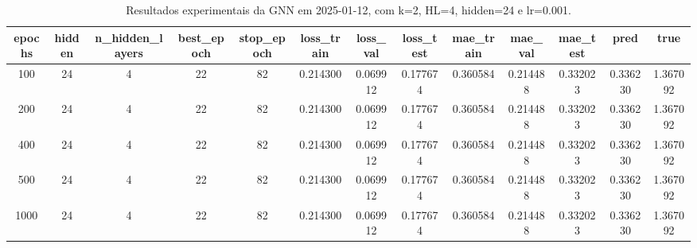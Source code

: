 \begin{table}[h]
\centering
\caption{Resultados experimentais da GNN em 2025-01-12, com k=2, HL=4, hidden=24 e lr=0.001.}
\label{tab:gnn_results_k2_hl4_h24_d20250112}
\begin{tabular}{ccccccccccccc}
\toprule
epochs & hidden & n\_hidden\_layers & best\_epoch & stop\_epoch & loss\_train & loss\_val & loss\_test & mae\_train & mae\_val & mae\_test & pred & true \\
\midrule
100 & 24 & 4 & 22 & 82 & 0.214300 & 0.069912 & 0.177674 & 0.360584 & 0.214488 & 0.332023 & 0.336230 & 1.367092 \\
200 & 24 & 4 & 22 & 82 & 0.214300 & 0.069912 & 0.177674 & 0.360584 & 0.214488 & 0.332023 & 0.336230 & 1.367092 \\
400 & 24 & 4 & 22 & 82 & 0.214300 & 0.069912 & 0.177674 & 0.360584 & 0.214488 & 0.332023 & 0.336230 & 1.367092 \\
500 & 24 & 4 & 22 & 82 & 0.214300 & 0.069912 & 0.177674 & 0.360584 & 0.214488 & 0.332023 & 0.336230 & 1.367092 \\
1000 & 24 & 4 & 22 & 82 & 0.214300 & 0.069912 & 0.177674 & 0.360584 & 0.214488 & 0.332023 & 0.336230 & 1.367092 \\
\bottomrule
\end{tabular}
\end{table}
